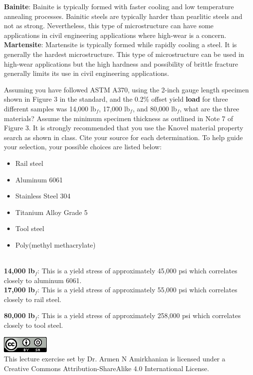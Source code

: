 \documentclass[addpoints,12pt,answers]{exam}
\begin{document}
\begin{questions}
\begin{solution}
\textbf{Bainite}: Bainite is typically formed with faster cooling and low temperature annealing processes. Bainitic steels are typically harder than pearlitic steels and not as strong. Nevertheless, this type of microstructure can have some applications in civil engineering applications where high-wear is a concern.\\

\textbf{Martensite}: Martensite is typically formed while rapidly cooling a steel. It is generally the hardest microstructure. This type of microstructure can be used in high-wear applications but the high hardness and possibility of brittle fracture generally limits its use in civil engineering applications.
\end{solution}

\question[6] Assuming you have followed ASTM A370, using the 2-inch gauge length specimen shown in Figure 3 in the standard, and the 0.2\% offset yield \textbf{load} for three different samples was 14,000 lb$_f$, 17,000 lb$_f$, and 80,000 lb$_f$, what are the three materials? Assume the minimum specimen thickness as outlined in Note 7 of Figure 3. It is strongly recommended that you use the Knovel material property search as shown in class. Cite your source for each determination. To help guide your selection, your possible choices are listed below:
\begin{itemize}
    \item Rail steel
    \item Aluminum 6061
    \item Stainless Steel 304
    \item Titanium Alloy Grade 5
    \item Tool steel
    \item Poly(methyl methacrylate)
\end{itemize}

\begin{solution}\\
\textbf{14,000 lb$_f$}: This is a yield stress of approximately 45,000 psi which correlates closely to aluminum 6061.\\

\textbf{17,000 lb$_f$}: This is a yield stress of approximately 55,000 psi which correlates closely to rail steel.

\textbf{80,000 lb$_f$}: This is a yield stress of approximately 258,000 psi which correlates closely to tool steel.
\end{solution}

\end{questions}
\begin{center}
\includegraphics[scale=0.6]{88x31.png}\\
This lecture exercise set by Dr. Armen N Amirkhanian is licensed under a Creative Commons Attribution-ShareAlike 4.0 International License.
\end{center}
\end{document}
